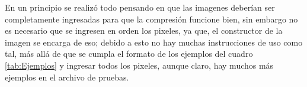 En un principio se realizó todo pensando en que las imagenes deberían ser completamente ingresadas para que la compresión
funcione  bien, sin embargo no es necesario que se ingresen en orden los pixeles, ya que, el constructor de la imagen se 
encarga de eso; debido a esto no hay muchas instrucciones de uso como tal, más allá de que se cumpla el formato 
de los ejemplos del cuadro \ref{tab:Ejemplos} y ingresar todos los pixeles, aunque claro, 
hay muchos más ejemplos en el archivo de pruebas.
